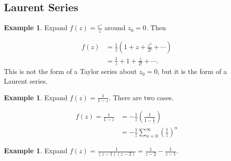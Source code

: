 \documentclass[12pt]{article}
\newcommand{\abs}[1]{ \left| #1 \right| }
\theoremstyle{definition}
\newtheorem{exmp}[thm]{Example}
\theoremstyle{remark}
\numberwithin{equation}{section}
\begin{document}
\subsection{Laurent Series}%
\label{sub:laurent_series}


\begin{exmp}
  Expand $f(z) = \frac{e^z}{z}$ around $z_0 = 0$. Then

  \begin{align}
    f(z) &= \frac{1}{z} \left( 1 + z + \frac{z^1}{2!} + \cdots \right)\\
         &= \frac{1}{z} + 1 + \frac{z}{2!} + \cdots.
  \end{align}
  This is not the form of a Taylor series about $z_0 = 0$, but it is the form of a Laurent series.
\end{exmp}

\begin{exmp}
  Expand $f(z) = \frac{1}{1-z}$. There are two cases.



  \begin{align}
    f(z) = \frac{1}{1-z} &= -\frac{1}{z} \left( \frac{1}{1 - \frac{1}{z}} \right) \\
                         &= - \frac{1}{z} \sum_{n=0}^\infty \left( \frac{1}{z} \right)^n
  \end{align}
\end{exmp}

\begin{exmp}
  Expand $f(z) = \frac{1}{(z-1)(z-2)} = \frac{1}{z-2} - \frac{1}{z-1}$.
  
\end{exmp}
\end{document}
